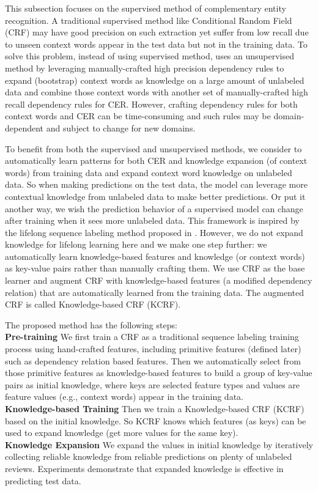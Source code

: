 This subsection focuses on the supervised method of complementary entity recognition. A traditional supervised method like Conditional Random Field (CRF) may have good precision on such extraction yet suffer from low recall due to unseen context words appear in the test data but not in the training data. To solve this problem, instead of using supervised method, \cite{xu2016CER} uses an unsupervised method by leveraging manually-crafted high precision dependency rules \cite{bach2007review,culotta2004dependency,bunescu2005shortest,joshi2009generalizing} to expand (bootstrap) context words as knowledge on a large amount of unlabeled data and combine those context words with another set of manually-crafted high recall dependency rules for CER. However, crafting dependency rules for both context words and CER can be time-consuming and such rules may be domain-dependent and subject to change for new domains.

To benefit from both the supervised and unsupervised methods, we consider to automatically learn patterns for both CER and knowledge expansion (of context words) from training data and expand context word knowledge on unlabeled data. So when making predictions on the test data, the model can leverage more contextual knowledge from unlabeled data to make better predictions. Or put it another way, we wish the prediction behavior of a supervised model can change after training when it sees more unlabeled data. This framework is inspired by the lifelong sequence labeling method proposed in \cite{shu2017lifelong,shu2016supervised}. However, we do not expand knowledge for lifelong learning here and we make one step further: we automatically learn knowledge-based features and knowledge (or context words) as key-value pairs rather than manually crafting them. We use CRF as the base learner and augment CRF with knowledge-based features (a modified dependency relation) that are automatically learned from the training data. The augmented CRF is called Knowledge-based CRF (KCRF).

The proposed method has the following steps:\\
\textbf{Pre-training} We first train a CRF as a traditional sequence labeling training process using hand-crafted features, including primitive features (defined later) such as dependency relation based features. Then we automatically select from those primitive features as knowledge-based features to build a group of key-value pairs as initial knowledge, where keys are selected feature types and values are feature values (e.g., context words) appear in the training data.\\ 
\textbf{Knowledge-based Training} Then we train a Knowledge-based CRF (KCRF) based on the initial knowledge. So KCRF knows which features (as keys) can be used to expand knowledge (get more values for the same key).\\
\textbf{Knowledge Expansion} We expand the values in initial knowledge by iteratively collecting reliable knowledge from reliable predictions on plenty of unlabeled reviews. Experiments demonstrate that expanded knowledge is effective in predicting test data.

